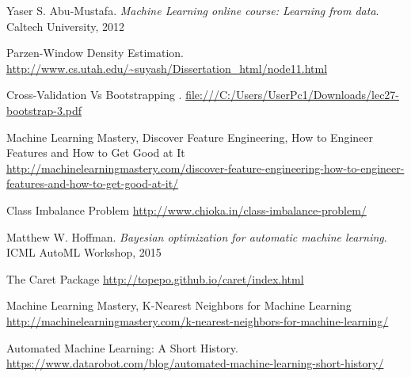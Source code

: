 \documentclass{article}
\begin{document}
\begin{thebibliography}{9}
Yaser S. Abu-Mustafa.
\textit{Machine Learning online course: Learning from data}. 
Caltech University, 2012

Parzen-Window Density Estimation.
\url{http://www.cs.utah.edu/~suyash/Dissertation_html/node11.html}

Cross-Validation Vs Bootstrapping .
\url{file:///C:/Users/UserPc1/Downloads/lec27-bootstrap-3.pdf}

Machine Learning Mastery, Discover Feature Engineering, How to Engineer Features and How to Get Good at It
\url{http://machinelearningmastery.com/discover-feature-engineering-how-to-engineer-features-and-how-to-get-good-at-it/}

Class Imbalance Problem
\url{http://www.chioka.in/class-imbalance-problem/}

Matthew W. Hoffman.
\textit{Bayesian optimization for automatic machine
learning}. 
ICML  AutoML Workshop, 2015 

The Caret Package
\url{http://topepo.github.io/caret/index.html}

Machine Learning Mastery, K-Nearest Neighbors for Machine Learning
\url{http://machinelearningmastery.com/k-nearest-neighbors-for-machine-learning/}

Automated Machine Learning: A Short History.
\url{https://www.datarobot.com/blog/automated-machine-learning-short-history/}
\end{thebibliography}
\end{document}
